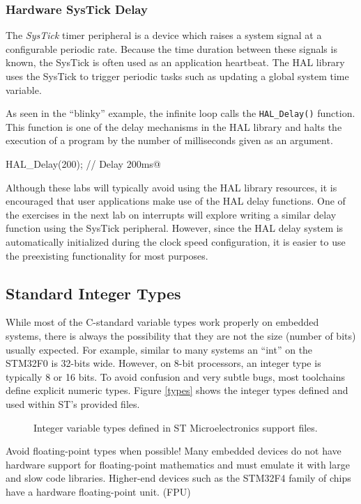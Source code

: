 \documentclass[11pt,fleqn]{book} %
\makeatletter
\newcommand{\ilcode}[1]{
    \smallskip
    \colorbox{gray!20!white}{
        \centering
        \parbox{\linewidth-2\fboxsep}{
            \lstinline@#1@
        }
    }
}
\newcommand{\code}[3]{
    \begin{figure}[]
        \begin{center}
            \hspace*{-3.4cm}
            \colorbox{gray!20!white}{
                \parbox{0.8\paperwidth} {
                    
                }
            }
            \caption{#2}
            \label{#3}
        \end{center}
    \end{figure}
}
\makeatother
\begin{document}
\subsubsection{Hardware SysTick Delay}

The \textit{SysTick} timer peripheral is a device which raises a system signal at a configurable periodic rate. Because the time duration between these signals is known, the SysTick is often used as an application heartbeat. The HAL library uses the SysTick to trigger periodic tasks such as updating a global system time variable. 

As seen in the ``blinky'' example, the infinite loop calls the \texttt{HAL\_Delay()} function. This function is one of the delay mechanisms in the HAL library and halts the execution of a program by the number of milliseconds given as an argument. 

\ilcode{HAL_Delay(200); // Delay 200ms}

Although these labs will typically avoid using the HAL library resources, it is encouraged that user applications make use of the HAL delay functions. One of the exercises in the next lab on interrupts will explore writing a similar delay function using the SysTick peripheral. However, since the HAL delay system is automatically initialized during the clock speed configuration, it is easier to use the preexisting functionality for most purposes. 

\subsection{Standard Integer Types}

While most of the C-standard variable types work properly on embedded systems, there is always the possibility that they are not the size (number of bits) usually expected. For example, similar to many systems an ``int'' on the STM32F0 is 32-bits wide. However, on 8-bit processors, an integer type is typically 8 or 16 bits. To avoid confusion and very subtle bugs, most toolchains define explicit numeric types. Figure \vref{types} shows the integer types defined and used within ST's provided files.

\code{./files/types.h}{Integer variable types defined in ST Microelectronics support files.}{types}
\begin{warning}
    Avoid floating-point types when possible! Many embedded devices do not have hardware support for floating-point mathematics and must emulate it with large and slow code libraries. Higher-end devices such as the STM32F4 family of chips have a hardware floating-point unit. (FPU) 
\end{warning}
\end{document}
